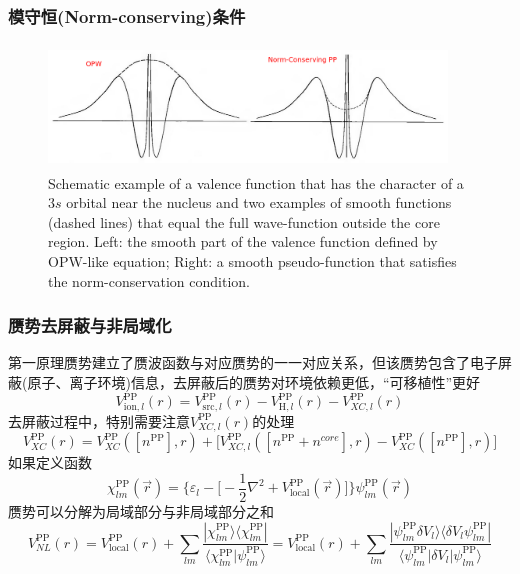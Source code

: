 \documentclass[cjk,slidestop,compress,mathserif,blue]{beamer}
\begin{document}
\frame
{
	\frametitle{模守恒\textrm{(Norm-conserving)}条件}
\begin{figure}[h!]
\centering
\vspace*{-0.10in}
\includegraphics[height=1.30in,width=4.17in,viewport=0 0 1150 350,clip]{Figures/Pseudo-OPW_NCPP.png}
\caption{\tiny \textrm{Schematic example of a valence function that has the character of a $3s$ orbital near the nucleus and two examples of smooth functions (dashed lines) that equal the full wave-function outside the core region. Left: the smooth part of the valence function defined by OPW-like equation; Right: a smooth pseudo-function that satisfies the norm-conservation condition.}}%
\label{Pseudo-OPW_NCPP}
\end{figure}
}

\frame
{
	\frametitle{赝势去屏蔽与非局域化}
	第一原理赝势建立了赝波函数与对应赝势的一一对应关系，但该赝势包含了电子屏蔽(原子、离子环境)信息，去屏蔽后的赝势对环境依赖更低，“可移植性”更好
	$$V_{\mathrm{ion},l}^{\mathrm{PP}}(r)=V_{\mathrm{src},l}^{\mathrm{PP}}(r)-V_{\mathrm{H},l}^{\mathrm{PP}}(r)-V_{XC,l}^{\mathrm{PP}}(r)$$
	去屏蔽过程中，特别需要注意$V_{XC,l}^{\mathrm{PP}}(r)$的处理
	$$V_{XC}^{\mathrm{PP}}(r)=V_{XC}^{\mathrm{PP}}([n^{\mathrm{PP}}],r)+\big[V_{XC,l}^{\mathrm{PP}}([n^{\mathrm{PP}}+n^{core}],r)-V_{XC}^{\mathrm{PP}}([n^{\mathrm{PP}}],r)\big]$$
	如果定义函数
	$$\chi_{lm}^{\mathrm{PP}}(\vec r)=\bigg\{\varepsilon_l-\bigg[-\dfrac12\nabla^2+V_{\mathrm{local}}^{\mathrm{PP}}(\vec r)\bigg]\bigg\}\psi_{lm}^{\mathrm{PP}}(\vec r)$$
	赝势可以分解为局域部分与非局域部分之和
	$$V_{NL}^{\mathrm{PP}}(r)=V_{\mathrm{local}}^{\mathrm{PP}}(r)+\sum_{lm}\dfrac{|\chi_{lm}^{\mathrm{PP}}\rangle\langle\chi_{lm}^{\mathrm{PP}}|}{\langle\chi_{lm}^{\mathrm{PP}}|\psi_{lm}^{\mathrm{PP}}\rangle}=V_{\mathrm{local}}^{\mathrm{PP}}(r)+\sum_{lm}\dfrac{|\psi_{lm}^{\mathrm{PP}}\delta V_l\rangle\langle\delta V_l\psi_{lm}^{\mathrm{PP}}|}{\langle\psi_{lm}^{\mathrm{PP}}|\delta V_l|\psi_{lm}^{\mathrm{PP}}\rangle}$$
}
\end{document}
